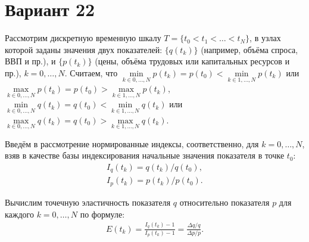 \documentclass{article}
\begin{document}
\section*{Вариант 22}
Рассмотрим дискретную временную шкалу $T=\{t_0<t_1<\ldots<t_N\}$, в узлах которой 
заданы значения двух показателей: $\{q(t_k)\}$ (например, объёма спроса, ВВП и пр.), и
$\{p(t_k)\}$ (цены, объёма трудовых или капитальных ресурсов и пр.), $k=0,\ldots,N$. Считаем, что
$\min\limits_{k\in0,\ldots,N} p(t_k)=p(t_0)<\min\limits_{k\in1,\ldots,N} p(t_k)$ или
$\max\limits_{k\in0,\ldots,N} p(t_k)=p(t_0)>\max\limits_{k\in1,\ldots,N} p(t_k)$,
$\min\limits_{k\in0,\ldots,N} q(t_k)=q(t_0)<\min\limits_{k\in1,\ldots,N} q(t_k)$ или
$\max\limits_{k\in0,\ldots,N} q(t_k)=q(t_0)>\max\limits_{k\in1,\ldots,N} q(t_k)$.

Введём в рассмотрение нормированные индексы, соответственно, для $k=0,\ldots,N$, взяв в
качестве базы индексирования начальные значения показателя в точке $t_0$:
\begin{align}
I_q(t_k)=q(t_k)/q(t_0), \\
I_p(t_k)=p(t_k)/p(t_0).
\end{align}

Вычислим точечную эластичность показателя $q$ относительно показателя $p$ для каждого
$k=0,\ldots,N$ по формуле:
\begin{align}
E(t_k)=\frac{I_q(t_k)-1}{I_p(t_k)-1}=\frac{\Delta q/q}{\Delta p/p}.
\end{align}
\end{document}
